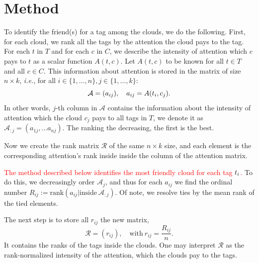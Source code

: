 \documentclass{llncs}
\begin{document}



%
\section{Method}

To identify the friend(s) for a tag among the clouds, we do the following. First, for each cloud, we rank all the tags by the attention the cloud pays to the tag. 
For each $t$ in $T$ and for each $c$ in $C$, we describe the intensity of attention which $c$ pays to $t$ as a scalar function $A(t, c)$. 
Let $A(t, c)$ to be known for all $t\in T$ and all $c \in C$. This information about attention is stored in the matrix of size $n\times k$, \textit{i.e.}, for all $i \in \{1, \dots, n\}, j  \in \{1, \dots, k\}$:
\[
\mathcal{A} = (a_{ij}), 
\quad a_{ij} = A(t_i, c_j).
\]
In other words, $j$-th column in $\mathcal{A}$ contains the information about the intensity of attention which the cloud $c_j$ pays to all tags in $T$,
we denote it as 
$\mathcal{A}_{:j} =(a_{1j}, \dots a_{nj})$.
The ranking the decreasing, the first is the best. 


Now we create the rank matrix $\mathcal{R}$ of the same $n\times k$ size, and each element is the corresponding attention's rank inside inside the column of the attention matrix. %

\textcolor{red}{The method described below identifies the most friendly cloud for each tag $t_i$.}
To do this, we decreasingly order $\mathcal{A}_{j}$, and thus for each $a_{ij}$ we find the ordinal number 
$R_{ij} := \text{rank}(a_{ij}|\text{inside}~\mathcal{A}_{:j})$.
Of note, we resolve ties by the mean rank of the tied elements.

The next step is to store all $r_{ij}$ the new matrix,
\[
\mathcal{R} = (r_{ij}), \quad \text{with}~ r_{ij} = \frac{R_{ij}}{n}.
\]
It contains the ranks of the tags inside the clouds. One may interpret $\mathcal{R}$ as the rank-normalized intensity of the attention, which the clouds pay to the tags.
\end{document}

